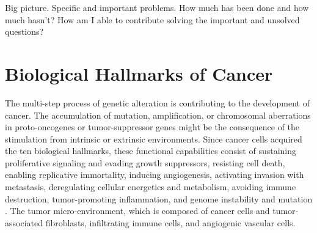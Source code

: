 \documentclass[12pt, a4paper]{article}
\begin{document}
\begin{outline}
\1 Big picture.
\1 Specific and important problems.
\2 How much has been done and how much hasn’t?
\2 How am I able to contribute solving the important and unsolved questions?
\end{outline}




\label{chap:intro}



\section{Biological Hallmarks of Cancer}

The multi-step process of genetic alteration is contributing to the development of cancer. The accumulation of mutation, amplification, or chromosomal aberrations in proto-oncogenes or tumor-suppressor genes might be the consequence of the stimulation from intrinsic or extrinsic environments.
Since cancer cells acquired the ten biological hallmarks, these functional capabilities consist of sustaining proliferative signaling and evading growth suppressors, resisting cell death, enabling replicative immortality, inducing angiogenesis, activating invasion with metastasis, deregulating cellular energetics and metabolism, avoiding immune destruction, tumor-promoting inflammation, and genome instability and mutation \citep{Hanahan2000, Hanahan2011, Hanahan2017}. The tumor micro-environment, which is composed of cancer cells and tumor‐associated fibroblasts, infiltrating immune cells, and angiogenic vascular cells.
\end{document}
